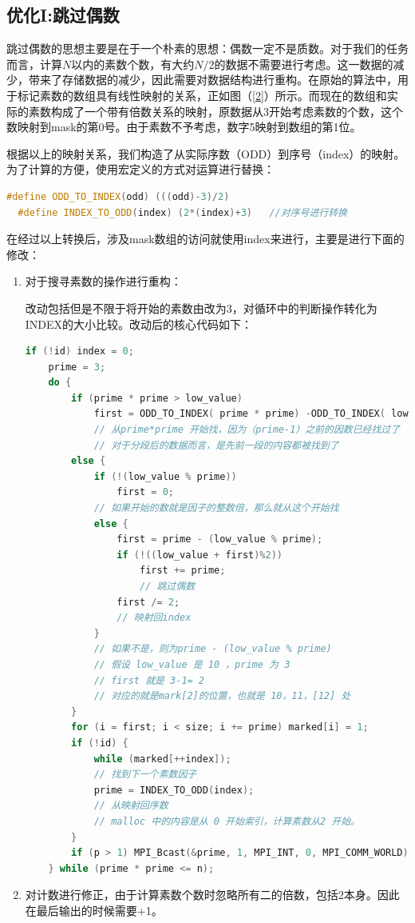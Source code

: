 \documentclass[a4paper,11pt,UTF8]{ctexart}
\begin{document}
\subsection{优化I:跳过偶数}

跳过偶数的思想主要是在于一个朴素的思想：偶数一定不是质数。对于我们的任务而言，计算$N$以内的素数个数，有大约$N/2$的数据不需要进行考虑。这一数据的减少，带来了存储数据的减少，因此需要对数据结构进行重构。在原始的算法中，用于标记素数的数组具有线性映射的关系，正如图（\ref{2}）所示。而现在的数组和实际的素数构成了一个带有倍数关系的映射，原数据从3开始考虑素数的个数，这个数映射到mask的第0号。由于素数不予考虑，数字5映射到数组的第1位。

根据以上的映射关系，我们构造了从实际序数（ODD）到序号（index）的映射。为了计算的方便，使用宏定义的方式对运算进行替换：
\begin{lstlisting}[language=C++]
  #define ODD_TO_INDEX(odd) (((odd)-3)/2)     
  #define INDEX_TO_ODD(index) (2*(index)+3)   //对序号进行转换
\end{lstlisting}

在经过以上转换后，涉及mask数组的访问就使用index来进行，主要是进行下面的修改：

\begin{enumerate}
  \item 对于搜寻素数的操作进行重构：
  
  改动包括但是不限于将开始的素数由改为3，对循环中的判断操作转化为INDEX的大小比较。改动后的核心代码如下：
  \begin{lstlisting}[language=C++]
    if (!id) index = 0;
    prime = 3;
    do {
        if (prime * prime > low_value)
            first = ODD_TO_INDEX( prime * prime) -ODD_TO_INDEX( low_value);
            // 从prime*prime 开始找，因为（prime-1）之前的因数已经找过了
            // 对于分段后的数据而言，是先前一段的内容都被找到了
        else {
            if (!(low_value % prime)) 
                first = 0;
            // 如果开始的数就是因子的整数倍，那么就从这个开始找
            else {
                first = prime - (low_value % prime);
                if (!((low_value + first)%2)) 
                    first += prime;           
                    // 跳过偶数
                first /= 2;
                // 映射回index
            }
            // 如果不是，则为prime - (low_value % prime)
            // 假设 low_value 是 10 ，prime 为 3
            // first 就是 3-1= 2
            // 对应的就是mark[2]的位置，也就是 10，11，[12] 处
        }
        for (i = first; i < size; i += prime) marked[i] = 1;
        if (!id) {
            while (marked[++index]);
            // 找到下一个素数因子
            prime = INDEX_TO_ODD(index);
            // 从映射回序数
            // malloc 中的内容是从 0 开始索引，计算素数从2 开始。
        }
        if (p > 1) MPI_Bcast(&prime, 1, MPI_INT, 0, MPI_COMM_WORLD);
    } while (prime * prime <= n);
  \end{lstlisting}

  \item 对计数进行修正，由于计算素数个数时忽略所有二的倍数，包括2本身。因此在最后输出的时候需要+1。
  
\end{enumerate}
\end{document}
